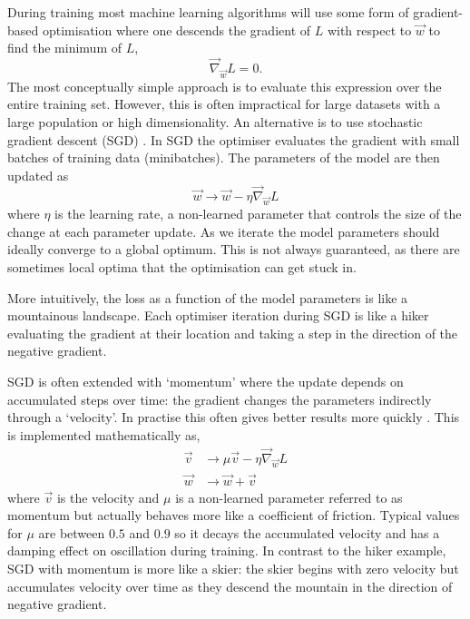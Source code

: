 During training most machine learning algorithms will use some form of gradient-based optimisation where one descends the gradient of $L$ with respect to $\vec{w}$ to find the minimum of $L$,
\begin{equation}
    \vec{\nabla}_{\vec{w}}L = 0.
\end{equation}
The most conceptually simple approach is to evaluate this expression over the entire training set. However, this is often impractical for large datasets with a large population or high dimensionality. 
An alternative is to use stochastic gradient descent (SGD) \cite{DeepLearningBook}. In SGD the optimiser evaluates the gradient with small batches of training data (minibatches). 
The parameters of the model are then updated as
\begin{equation}
    \vec{w} \rightarrow \vec{w} - \eta\vec{\nabla}_{\vec{w}}L
\end{equation}
where $\eta$ is the learning rate, a non-learned parameter that controls the size of the change at each parameter update. 
As we iterate the model parameters should ideally converge to a global optimum. 
This is not always guaranteed, as there are sometimes local optima that the optimisation can get stuck in. 

More intuitively, the loss as a function of the model parameters is like a mountainous landscape. 
Each optimiser iteration during SGD is like a hiker evaluating the gradient at their location and taking a step in the direction of the negative gradient.

SGD is often extended with `momentum' where the update depends on accumulated steps over time: the gradient changes the parameters indirectly through a `velocity'. 
In practise this often gives better results more quickly \cite{CS231n}.
This is implemented mathematically as,
\begin{equation}
    \begin{split}
        \vec{v} &\rightarrow \mu\vec{v} - \eta\vec{\nabla}_{\vec{w}}L \\
        \vec{w} &\rightarrow \vec{w} + \vec{v}
    \end{split}
\end{equation}
where $\vec{v}$ is the velocity and $\mu$ is a non-learned parameter referred to as momentum but actually behaves more like a coefficient of friction. 
Typical values for $\mu$ are between $0.5$ and $0.9$ so it decays the accumulated velocity and has a damping effect on oscillation during training. 
In contrast to the hiker example, SGD with momentum is more like a skier: the skier begins with zero velocity but accumulates velocity over time as they descend the mountain in the direction of negative gradient. 

